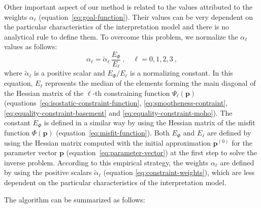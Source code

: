 \documentclass[manuscript]{geophysics}
\begin{document}
Other important aspect of our method is related to the values attributed to 
the weights $\alpha_{\ell}$ (equation~\ref{eq:goal-function}).
Their values can be very dependent on the particular characteristics of the 
interpretation model and there is no analytical rule to define them. 
To overcome this problem, we normalize the $\alpha_{\ell}$ values as follows:
\begin{equation}
\alpha_{\ell} = \tilde{\alpha}_{\ell} \, \frac{E_{\Phi}}{E_{\ell}} \: 
, \quad \ell = 0, 1, 2, 3 \: ,
\label{eq:constraint-weights}
\end{equation}
where $\tilde{\alpha}_{\ell}$ is a positive scalar and $E_{\Phi} / E_{\ell}$
is a normalizing constant. In this equation, $E_{\ell}$ represents the median 
of the elements forming the main diagonal of the Hessian matrix of the 
$\ell$-th constraining function $\Psi_{\ell}(\mathbf{p})$ 
(equations~\ref{eq:isostatic-constraint-function}, 
\ref{eq:smootheness-contraint}, \ref{eq:equality-constraint-basement} and 
\ref{eq:equality-constraint-moho}). The constant $E_{\Phi}$ is defined in 
a similar way by using the Hessian matrix of the misfit function $\Phi(\mathbf{p})$ 
(equation~\ref{eq:misfit-function}). 
Both $E_{\Phi}$ and $E_{\ell}$ are defined by using the Hessian matrix computed with 
the initial approximation $\mathbf{p}^{(0)}$ for the parameter vector $\mathbf{p}$ 
(equation~\ref{eq:parameter-vector}) at the first step to solve the inverse problem.
According to this empirical strategy, the weights $\alpha_{\ell}$ are defined 
by using the positive scalars $\tilde{\alpha}_{\ell}$ 
(equation \ref{eq:constraint-weights}), which are less dependent on the particular 
characteristics of the interpretation model.

The algorithm can be summarized as follows:
\end{document}
